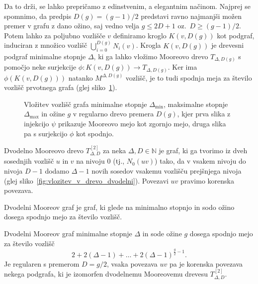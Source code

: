\documentclass[fin1, tisk]{fmfdelo}
\begin{document}
\begin{opomba}\label{op:moore_lower}
    Da to drži, se lahko prepričamo z edinstvenim, a elegantnim načinom. 
    Najprej se spomnimo, da predpis $D(g) = (g-1)/2$ predstavi ravno 
    najmanjši možen premer v grafu z dano ožino, saj vedno velja
    $g \leq 2D + 1$ oz.~$D \geq (g-1)/2$.
    Potem lahko za poljubno 
    vozlišče $v$ definiramo kroglo $K(v, D(g))$ kot podgraf, induciran z množico
    vozlišč $\bigcup_{i=0}^{D(g)} N_i(v)$. Krogla $K(v, D(g))$ je drevesni podgraf minimalne stopnje $\Delta$,
    ki ga lahko vložimo Mooreovo drevo $T_{\Delta, D(g)}$ s pomočjo
    neke surjekcije $\phi: K(v, D(g)) \to T_{\Delta, D(g)}$. Ker ima $\phi(K(v, D(g)))$ natanko
    $M^{\Delta, D(g)}$ vozlišč, je to tudi spodnja meja za število vozlišč prvotnega grafa (glej sliko~\ref{fig:vlozitev_v_drevo_moore}).
\end{opomba}

\begin{figure}[ht]
    \centering
    \def\svgwidth{\columnwidth}
    \caption{Vložitev vozlišč grafa minimalne stopnje $\Delta_{\min}$, maksimalne stopnje $\Delta_{\max}$ in
    ožine $g$ v regularno drevo premera $D(g)$, kjer prva slika z injekcijo $\psi$ prikazuje Mooreovo mejo kot zgornjo mejo,
    druga slika pa s surjekcijo $\phi$ kot spodnjo.}
    \label{fig:vlozitev_v_drevo_moore}
\end{figure}

\begin{definicija}
    Dvodelno Mooreovo drevo $T^{[2]}_{\Delta, D}$ za neka $\Delta, D\in\mathbb{N}$ je graf, ki ga tvorimo iz dveh sosednjih vozlišč $u$ in $v$ 
    na nivoju $0$ (tj., $N_0(uv)$) tako,
    da v vsakem nivoju do nivoja $D-1$ dodamo $\Delta - 1$ novih sosedov vsakemu vozlišču prejšnjega nivoja
    (glej sliko~\ref{fig:vlozitev_v_drevo_dvodelni}). Povezavi $uv$ pravimo
    korenska povezava.
\end{definicija}

\begin{definicija}\label{def:dvodelni_moore}
    Dvodelni Mooreov graf je graf, ki glede na minimalno stopnjo in sodo ožino dosega spodnjo mejo za število vozlišč.
\end{definicija}

\begin{trditev}\label{tr:moore_dvodelni_lower}
Dvodelni Mooreov graf minimalne stopnje $\Delta$ in sode ožine $g$ dosega spodnjo mejo za število vozlišč
\[2 + 2(\Delta-1) + \ldots + 2(\Delta-1)^{\frac{g}{2}-1}.\]
Je regularen s premerom $D = g/2$, vsaka povezava $uv$ pa je korenska povezava nekega podgrafa, ki je
izomorfen dvodelnemu Mooreovemu drevesu
$T^{[2]}_{\Delta, D}$.
\end{trditev}
\end{document}
